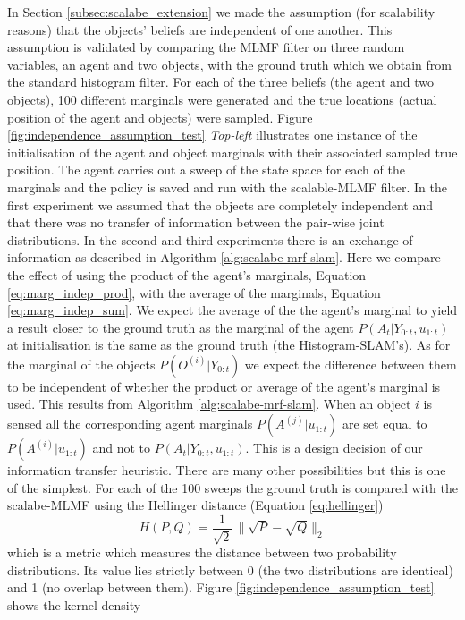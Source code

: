 In Section \ref{subsec:scalabe_extension} we made the assumption (for scalability reasons) that the objects' beliefs are independent
of one another. This assumption is validated by comparing the MLMF filter on three random variables, an agent and two objects, with the ground truth
which we obtain from the standard histogram filter. For each of the three beliefs (the agent and two objects), 100 different marginals 
were generated and the true locations (actual position of the agent and objects) were sampled. 
Figure \ref{fig:independence_assumption_test} \textit{Top-left} illustrates one instance of the initialisation of the agent and object marginals
with their associated sampled true position.
The agent carries out  a sweep of the state space for each of the marginals and the policy is saved 
and run with the scalable-MLMF filter. In the first experiment we assumed that the objects are completely independent 
and that there was no transfer of information between the pair-wise joint distributions. In the second and third experiments there 
is an exchange of information as described in Algorithm \ref{alg:scalabe-mrf-slam}. Here we compare the effect of using 
the product of the agent's marginals, Equation \ref{eq:marg_indep_prod}, with the average of the marginals, Equation \ref{eq:marg_indep_sum}.
We expect the average of the the agent's marginal to yield a result closer to the ground truth as the marginal of the 
agent $P(A_t|Y_{0:t},u_{1:t})$ at initialisation is the same as the ground truth (the Histogram-SLAM's). As for the marginal of the 
objects $P(O^{(i)}|Y_{0:t})$ we expect the difference between them to be independent of whether the product or average of the 
agent's marginal is used. This results from Algorithm \ref{alg:scalabe-mrf-slam}. When an object $i$ is sensed all the corresponding 
agent marginals $P(A^{(j)}|u_{1:t})$ are set equal to $P(A^{(i)}|u_{1:t})$ and not to $P(A_t|Y_{0:t},u_{1:t})$. This is a design 
decision of our information transfer heuristic. There are many other possibilities but this is one of the simplest.
For each of the 100 sweeps the ground truth is compared with the scalabe-MLMF using the Hellinger distance (Equation \ref{eq:hellinger})
\begin{equation} \label{eq:hellinger}
 H(P,Q) = \frac{1}{\sqrt{2}}\, \|\sqrt{P} - \sqrt{Q}\|_2  
\end{equation}
which is a metric which measures the distance between two probability distributions. Its value lies strictly between 0 (the two 
distributions are identical) and 1 (no overlap between them). Figure \ref{fig:independence_assumption_test} shows the kernel density 
